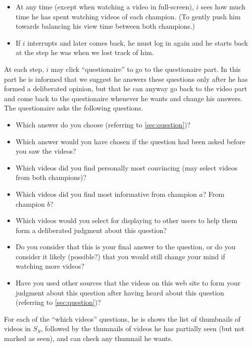 \documentclass[version=3.21, pagesize, twoside=off, bibliography=totoc, DIV=calc, fontsize=12pt, a4paper]{scrartcl}
\begin{document}
\begin{itemize}
	\item At any time (except when watching a video in full-screen), $i$ sees how much time he has spent watching videos of each champion. (To gently push him towards balancing his view time between both champions.)
	\item If $i$ interrupts and later comes back, he must log in again and he starts back at the step he was when we lost track of him.
\end{itemize}
At each step, $i$ may click “questionaire” to go to the questionaire part. In this part he is informed that we suggest he answers these questions only after he has formed a deliberated opinion, but that he can anyway go back to the video part and come back to the questionaire whenever he wants and change his answers. The questionaire asks the following questions.
\begin{itemize}
	\item Which answer do you choose (referring to \cref{sec:question})?
	\item Which answer would you have chosen if the question had been asked before you saw the videos?
	\item Which videos did you find personally most convincing (may select videos from both champions)?
	\item Which videos did you find most informative from champion $a$? From champion $b$?
	\item Which videos would you select for displaying to other users to help them form a deliberated judgment about this question?
	\item Do you consider that this is your final answer to the question, or do you consider it likely (possible?) that you would still change your mind if watching more videos?
	\item Have you used other sources that the videos on this web site to form your judgment about this question after having heard about this question (referring to \cref{sec:question})?
\end{itemize}
For each of the “which videos” questions, he is shows the list of thumbnails of videos in $S_S$, followed by the thumnails of videos he has partially seen (but not marked as seen), and can check any thumnail he wants.
\end{document}
